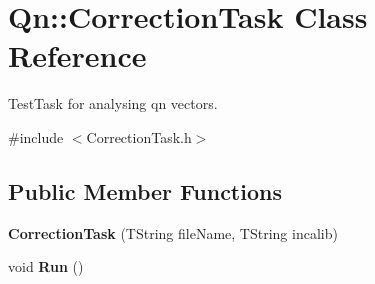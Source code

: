 \hypertarget{classQn_1_1CorrectionTask}{}\section{Qn\+:\+:Correction\+Task Class Reference}
\label{classQn_1_1CorrectionTask}


Test\+Task for analysing qn vectors.  




{\ttfamily \#include $<$Correction\+Task.\+h$>$}

\subsection*{Public Member Functions}
\begin{DoxyCompactItemize}
\item 
\mbox{\label{classQn_1_1CorrectionTask_a3657a99e107084b54907e890948c44c4}} 
{\bfseries Correction\+Task} (T\+String file\+Name, T\+String incalib)
\item 
\mbox{\label{classQn_1_1CorrectionTask_a13e7364e980af1cf4071b3cdb7b690da}} 
void {\bfseries Run} ()
\end{DoxyCompactItemize}
